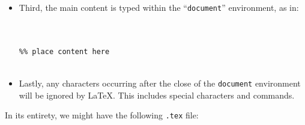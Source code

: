 \begin{itemize}
\begin{center}
\begin{minipage}{.8\linewidth}
\begin{framed}
\begin{verbatim}
\pagestyle{fancy}
\cfoot{\thepage}
\title{A Document}
\end{verbatim}
      \end{framed}
    \end{minipage}
  \end{center}

  which provides the functionality from the \texttt{fancyhdr} package, sets the
  ``\texttt{pagestyle}'' to ``fancy'', places the page number in the center of
  the footer, and sets the title to ``A Document''.

  This is also part of the \textit{preamble}.

\item Third, the main content is typed within the ``\texttt{document}''
  environment, as in: \\

  \begin{center}
    \begin{minipage}{.8\linewidth}
      \begin{framed}
\begin{verbatim}


%% place content here


\end{verbatim}
      \end{framed}
    \end{minipage}
  \end{center}

\item Lastly, any characters occurring after the close of the \texttt{document}
  environment will be ignored by \LaTeX{}. This includes special characters and
  commands.

\end{itemize}

In its entirety, we might have the following \texttt{.tex} file:



